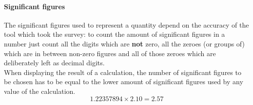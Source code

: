 \paragraph{Significant figures} The significant figures used to represent a quantity depend on the accuracy of the tool which took the survey: to count the amount of significant figures in a number just count all the digits which are \textbf{not} zero, all the zeroes (or groups of) which are in between non-zero figures and all of those zeroes which are deliberately left as decimal digits.\\
When displaying the result of a calculation, the number of significant figures to be chosen has to be equal to the lower amount of significant figures used by any value of the calculation.
\begin{equation*}
    1.22357894\times2.10 = 2.57
\end{equation*}